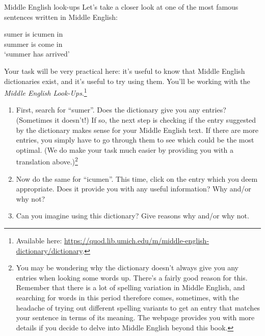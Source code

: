 \begin{exercises}{Middle English look-ups}
Let's take a closer look at one of the most famous sentences written in Middle English:

\begin{exe}
    \ex \gll sumer is icumen in\\
    summer is come in\\
    \trans `summer has arrived' 
\end{exe}

\noindent Your task will be very practical here: it's useful to know that Middle English dictionaries exist, and it's useful to try using them. You'll be working with the \textit{Middle English Look-Ups}.\footnote{Available here: \url{https://quod.lib.umich.edu/m/middle-english-dictionary/dictionary}.}
\begin{enumerate}
    \item First, search for ``sumer''. Does the dictionary give you any entries? (Sometimes it doesn't!) If so, the next step is checking if the entry suggested by the dictionary makes sense for your Middle English text. If there are more entries, you simply have to go through them to see which could be the most optimal. (We do make your task much easier by providing you with a translation above.)\footnote{You may be wondering why the dictionary doesn't always give you any entries when looking some words up. There's a fairly good reason for this. Remember that there is a lot of spelling variation in Middle English, and searching for words in this period therefore comes, sometimes, with the headache of trying out different spelling variants to get an entry that matches your sentence in terms of its meaning. The webpage provides you with more details if you decide to delve into Middle English beyond this book.}
    \item Now do the same for ``icumen''. This time, click on the entry which you deem appropriate. Does it provide you with any useful information? Why and/or why not? 
    \newpage
    \item Can you imagine using this dictionary? Give reasons why and/or why not.
\end{enumerate}


\end{exercises}

